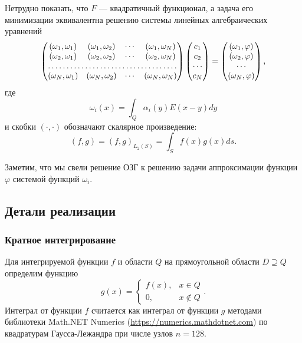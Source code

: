 \documentclass[a4paper, 12pt]{article}
\newcommand{\V}[1]{\int_Q #1(y) E(x-y) dy}
\begin{document}
Нетрудно показать, что $F$ --- квадратичный функционал, а задача его минимизации эквивалентна решению системы линейных алгебраических уравнений
\begin{equation}
    \begin{pmatrix}
        (\omega_1, \omega_1) & (\omega_1, \omega_2) & \cdots & (\omega_1, \omega_N)\\
        (\omega_2, \omega_1) & (\omega_2, \omega_2) & \cdots & (\omega_2, \omega_N)\\
        \hdotsfor{4}\\
        (\omega_N, \omega_1) & (\omega_N, \omega_2) & \cdots & (\omega_N, \omega_N)\\
    \end{pmatrix}
    \begin{pmatrix}
        c_1\\
        c_2\\
        \cdots\\
        c_N\\
    \end{pmatrix}
    =
    \begin{pmatrix}
        (\omega_1,\varphi)\\
        (\omega_2,\varphi)\\
        \cdots\\
        (\omega_N,\varphi)\\
    \end{pmatrix},
    \label{gram}
\end{equation}
где 
\begin{equation}
    \omega_i(x)=\V{\alpha_i}
\end{equation}
и скобки $(\cdot,\cdot)$ обозначают скалярное произведение:
\begin{equation}
    (f,g)=(f,g)_{L_2(S)}=\int_S f(x)g(x) ds.
\end{equation}

Заметим, что мы свели решение ОЗГ к решению задачи аппроксимации функции $\varphi$ системой функций $\omega_i$. 

\subsection{Детали реализации}
\subsubsection{Кратное интегрирование}
Для интегрируемой функции $f$ и области $Q$ на прямоугольной области $D \supseteq Q$ определим функцию
\begin{equation*}
  g(x)=
  \begin{cases}
    f(x), & x \in Q\\
    0, & x \not \in Q
  \end{cases}.
\end{equation*}
Интеграл от функции $f$ считается как интеграл от функции $g$ методами библиотеки Math.NET Numerics (\url{https://numerics.mathdotnet.com})
по квадратурам Гаусса-Лежандра при числе узлов $n=128$.
\end{document}
